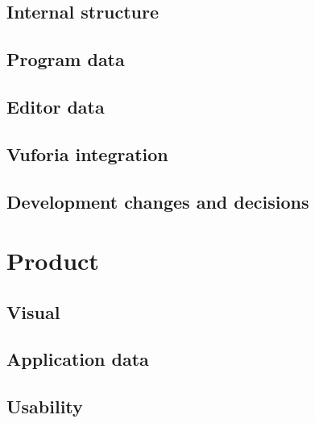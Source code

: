 \documentclass[BSP,english,oneside]{classes/gucthesis}
\begin{document}
	\newpage
	\section{Internal structure}
		\label{sec:internal_structure}
		

	\section{Program data}
		\label{sec:program_data}
		

	\section{Editor data}
		\label{sec:editor_data}
		

	\section{Vuforia integration}
		\label{sec:AR_library_integration}
		

	\section{Development changes and decisions}
		\label{sec:Developmentchangesanddecisions}
		


\chapter{Product}
	\label{chap:product}

	\section{Visual}
		\label{sec:visual}
		

	\section{Application data}
		\label{sec:application_data}
		

	\section{Usability}
		\label{sec:usability}
		
\end{document}
